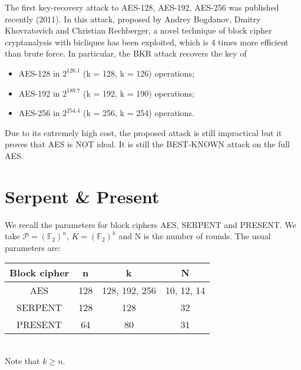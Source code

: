 \documentclass[a4paper, 10pt, titlepage]{article}
\begin{document}
The first key-recovery attack to AES-128, AES-192, AES-256 was published recently (2011).
In this attack, proposed by Andrey Bogdanov, Dmitry Khovratovich and Christian Rechberger, a novel technique of block cipher cryptanalysis with bicliques has been exploited, which is 4 times more efficient than brute force.
In particular, the BKR attack recovers the key of
\begin{itemize}
\item AES-128 in $2^{126.1}$ (k = 128, k = 126) operations;
\item AES-192 in $2^{189.7}$ (k = 192, k = 190) operations;
\item AES-256 in $2^{254.4}$ (k = 256, k = 254) operations.
\end{itemize}	
Due to its extremely high cost, the proposed attack is still impractical but it proves that AES is NOT ideal. It is still the BEST-KNOWN attack on the full AES.

\newpage
\section{Serpent \& Present}
We recall the parameters for block ciphers AES, SERPENT and PRESENT. We take $\mathcal{P} = (\mathbb{F}_2)^n$, $K = (\mathbb{F}_2)^k$ and N is the number of rounds.
The usual parameters are: \medskip \\
\begin{tabular}{|c|c|c|c|} \hline
Block cipher & n & k & N \\ \hline
AES & 128 & 128, 192, 256 & 10, 12, 14 \\
SERPENT & 128 & 128 & 32 \\
PRESENT & 64 & 80 & 31 \\ \hline
\end{tabular} \medskip \\ 
Note that $k \geq n$.
\end{document}
